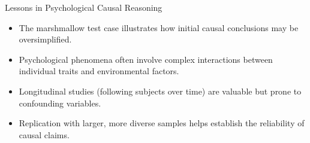\documentclass{beamer}
\begin{document}
\begin{frame}{Lessons in Psychological Causal Reasoning}
    \begin{itemize}
        \item The marshmallow test case illustrates how initial causal conclusions may be oversimplified.
        \item Psychological phenomena often involve complex interactions between individual traits and environmental factors.
        \item Longitudinal studies (following subjects over time) are valuable but prone to confounding variables.
        \item Replication with larger, more diverse samples helps establish the reliability of causal claims.
    \end{itemize}
    
    \begin{center}
    \end{center}
\end{frame}
\end{document}
